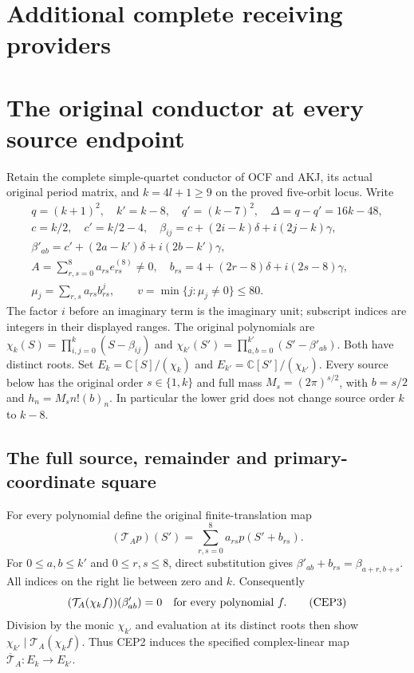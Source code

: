 \documentclass[11pt,a4paper]{article}
\begin{document}
\section{Additional complete receiving providers}

\clearpage
\section{The original conductor at every source endpoint}
\label{sec:CEP}

Retain the complete simple-quartet conductor of OCF and AKJ, its
actual original period matrix, and $k=4l+1\ge9$ on the proved
five-orbit locus. Write
\[
 \begin{gathered}
 q=(k+1)^2,\quad k'=k-8,\quad q'=(k-7)^2,\quad
 \Delta=q-q'=16k-48,\\
 c=k/2,\quad c'=k/2-4,\quad
 \beta_{ij}=c+(2i-k)\delta+i(2j-k)\gamma,\\
 \beta'_{ab}=c'+(2a-k')\delta+i(2b-k')\gamma,\\
 A=\sum_{r,s=0}^8a_{rs}e_{rs}^{(8)}\ne0,\quad
 b_{rs}=4+(2r-8)\delta+i(2s-8)\gamma,\\
 \mu_j=\sum_{r,s}a_{rs}b_{rs}^j,\qquad
 v=\min\{j:\mu_j\ne0\}\le80.
 \end{gathered}\tag{CEP1}
\]
The factor $i$ before an imaginary term is the imaginary unit;
subscript indices are integers in their displayed ranges. The
original polynomials are
$\chi_k(S)=\prod_{i,j=0}^k(S-\beta_{ij})$ and
$\chi_{k'}(S')=\prod_{a,b=0}^{k'}(S'-\beta'_{ab})$.
Both have distinct roots. Set
$E_k=\mathbb C[S]/(\chi_k)$ and
$E_{k'}=\mathbb C[S']/(\chi_{k'})$.
Every source below has the original order $s\in\{1,k\}$ and
full mass $M_s=(2\pi)^{s/2}$, with $b=s/2$ and
$h_n=M_s n!(b)_n$. In particular the lower grid does not change
source order $k$ to $k-8$.

\subsection{The full source, remainder and primary-coordinate square}

For every polynomial define the original finite-translation map
\[
 (\mathcal T_Ap)(S')=\sum_{r,s=0}^8a_{rs}p(S'+b_{rs}).
 \tag{CEP2}
\]
For $0\le a,b\le k'$ and $0\le r,s\le8$, direct substitution gives
$\beta'_{ab}+b_{rs}=\beta_{a+r,b+s}$. All indices on the right lie
between zero and $k$. Consequently
\[
 (\mathcal T_A(\chi_k f))(\beta'_{ab})=0
 \quad\hbox{for every polynomial }f.
 \tag{CEP3}
\]
Division by the monic $\chi_{k'}$ and evaluation at its distinct roots
then show $\chi_{k'}\mid\mathcal T_A(\chi_k f)$. Thus CEP2 induces
the specified complex-linear map
$\overline{\mathcal T}_A:E_k\longrightarrow E_{k'}$.
\end{document}
